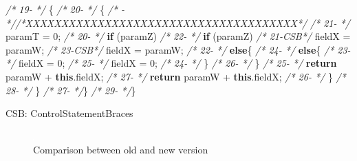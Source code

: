 \documentclass[
]{article}
\newenvironment{Shaded}{\begin{snugshade}}{\end{snugshade}}
\newcommand{\CommentTok}[1]{\textcolor[rgb]{0.56,0.35,0.01}{\textit{#1}}}
\newcommand{\DecValTok}[1]{\textcolor[rgb]{0.00,0.00,0.81}{#1}}
\newcommand{\FunctionTok}[1]{\textcolor[rgb]{0.00,0.00,0.00}{#1}}
\newcommand{\KeywordTok}[1]{\textcolor[rgb]{0.13,0.29,0.53}{\textbf{#1}}}
\newcommand{\NormalTok}[1]{#1}
\begin{document}
\begin{landscape}
\begin{Shaded}
\begin{Highlighting}[]
\CommentTok{/* 19-   */}\NormalTok{    \{                                                    }\CommentTok{/* 20-   */}\NormalTok{    \{                                                    }
\CommentTok{/*   -   *//*XXXXXXXXXXXXXXXXXXXXXXXXXXXXXXXXXXXXXX*/}               \CommentTok{/* 21-   */}\NormalTok{        paramT = }\DecValTok{0}\NormalTok{;                                      }
\CommentTok{/* 20-   */}        \KeywordTok{if}\NormalTok{ (paramZ)                                      }\CommentTok{/* 22-   */}        \KeywordTok{if}\NormalTok{ (paramZ)                                      }
\CommentTok{/* 21-CSB*/}\NormalTok{            fieldX = paramW;                             }\CommentTok{/* 23-CSB*/}\NormalTok{            fieldX = paramW;                             }
\CommentTok{/* 22-   */}        \KeywordTok{else}\NormalTok{\{                                            }\CommentTok{/* 24-   */}        \KeywordTok{else}\NormalTok{\{                                            }
\CommentTok{/* 23-   */}\NormalTok{            fieldX = }\DecValTok{0}\NormalTok{;                                  }\CommentTok{/* 25-   */}\NormalTok{            fieldX = }\DecValTok{0}\NormalTok{;                                  }
\CommentTok{/* 24-   */}\NormalTok{        \}                                                }\CommentTok{/* 26-   */}\NormalTok{        \}                                                }
\CommentTok{/* 25-   */}        \KeywordTok{return}\NormalTok{ paramW + }\KeywordTok{this}\NormalTok{.}\FunctionTok{fieldX}\NormalTok{;                     }\CommentTok{/* 27-   */}        \KeywordTok{return}\NormalTok{ paramW + }\KeywordTok{this}\NormalTok{.}\FunctionTok{fieldX}\NormalTok{;                     }
\CommentTok{/* 26-   */}\NormalTok{     \}                                                   }\CommentTok{/* 28-   */}\NormalTok{     \}                                                   }
\CommentTok{/* 27-   */}\NormalTok{\}                                                        }\CommentTok{/* 29-   */}\NormalTok{\}                                                        }


\NormalTok{CSB: ControlStatementBraces}
\end{Highlighting}
\end{Shaded}

\normalsize

\begin{figure}
\centering
\includegraphics{figures/fake.png}
\caption{Comparison between old and new version
\label{comparison_include_statement_before}}
\end{figure}

\end{landscape}
\end{document}
